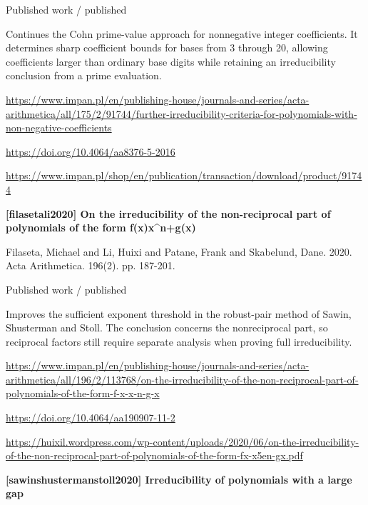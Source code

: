 \documentclass[11pt,a4paper,oneside,openany]{book}
\begin{document}
{\small\sffamily\color{atlasgold}Published work / published}\par
\color{black} Continues the Cohn prime-value approach for nonnegative integer coefficients. It determines sharp coefficient bounds for bases from 3 through 20, allowing coefficients larger than ordinary base digits while retaining an irreducibility conclusion from a prime evaluation.\par
{\footnotesize\url{https://www.impan.pl/en/publishing-house/journals-and-series/acta-arithmetica/all/175/2/91744/further-irreducibility-criteria-for-polynomials-with-non-negative-coefficients}}\par
{\footnotesize\url{https://doi.org/10.4064/aa8376-5-2016}}\par
{\footnotesize\url{https://www.impan.pl/shop/en/publication/transaction/download/product/91744}}\par
\vspace{9pt}
\hypertarget{ref:filasetali2020}{}
{\sffamily\bfseries\color{atlasgreen}[filasetali2020] On the irreducibility of the non-reciprocal part of polynomials of the form f(x)x\textasciicircum{}n+g(x)}\par
\color{black} Filaseta, Michael and Li, Huixi and Patane, Frank and Skabelund, Dane. 2020. Acta Arithmetica. 196(2). pp. 187-201.\par
{\small\sffamily\color{atlasgold}Published work / published}\par
\color{black} Improves the sufficient exponent threshold in the robust-pair method of Sawin, Shusterman and Stoll. The conclusion concerns the nonreciprocal part, so reciprocal factors still require separate analysis when proving full irreducibility.\par
{\footnotesize\url{https://www.impan.pl/en/publishing-house/journals-and-series/acta-arithmetica/all/196/2/113768/on-the-irreducibility-of-the-non-reciprocal-part-of-polynomials-of-the-form-f-x-x-n-g-x}}\par
{\footnotesize\url{https://doi.org/10.4064/aa190907-11-2}}\par
{\footnotesize\url{https://huixil.wordpress.com/wp-content/uploads/2020/06/on-the-irreducibility-of-the-non-reciprocal-part-of-polynomials-of-the-form-fx-x5en-gx.pdf}}\par
\vspace{9pt}
\hypertarget{ref:sawinshustermanstoll2020}{}
{\sffamily\bfseries\color{atlasgreen}[sawinshustermanstoll2020] Irreducibility of polynomials with a large gap}\par
\end{document}
